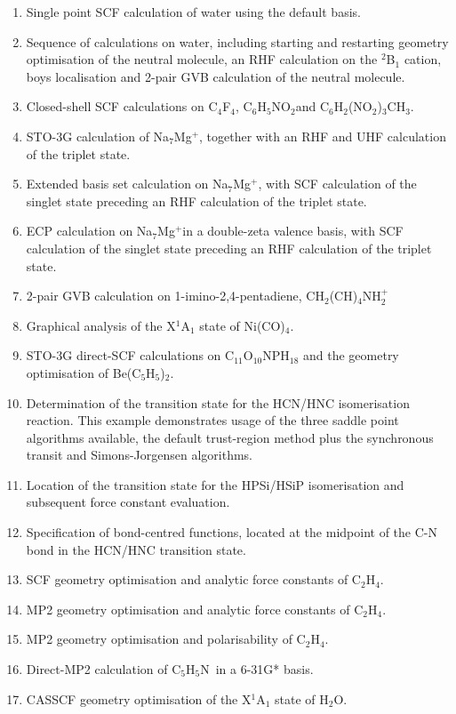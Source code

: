 \documentclass[11pt,fleqn]{article}
\newcommand{\water}{\mbox{H$_{2}$O}}
\newcommand{\namgplus}{\mbox{Na$_{7}$Mg$^{+}$}}
\newcommand{\nitrobz}{\mbox{C$_{6}$H$_{5}$NO$_{2}$}}
\newcommand{\tnt}{\mbox{C$_{6}$H$_{2}$(NO$_{2}$)$_{3}$CH$_{3}$}}
\newcommand{\nico}{\mbox{Ni(CO)$_{4}$}}
\newcommand{\fcubane}{\mbox{C$_{4}$F$_{4}$}}
\newcommand{\ethene}{\mbox{C$_{2}$H$_{4}$}}
\newcommand{\pyridine}{\mbox{C$_{5}$H$_{5}$N}}
\begin{document}
\begin{enumerate}
\item Single point SCF calculation of water using the default basis.
\item Sequence of calculations on water, including starting and
restarting geometry optimisation of the neutral molecule,
an RHF calculation on the $^{2}$B$_{1}$ cation, boys localisation
and 2-pair GVB calculation of the neutral molecule. 
\item Closed-shell SCF calculations on \fcubane, \nitrobz and \tnt.
\item STO-3G calculation of \namgplus, together with an RHF and UHF
calculation of the triplet state.
\item Extended basis set calculation on \namgplus, with SCF calculation
of the singlet state preceding an RHF calculation of the triplet state.
\item ECP calculation on \namgplus in a double-zeta valence
basis, with SCF calculation
of the singlet state preceding an RHF calculation of the triplet state.
\item 2-pair GVB calculation on 
1-imino-2,4-pentadiene, CH$_{2}$(CH)$_{4}$NH$_{2}^{+}$
\item Graphical analysis of the X$^{1}$A$_{1}$ state of \nico.
\item STO-3G direct-SCF calculations on C$_{11}$O$_{10}$NPH$_{18}$
and the geometry optimisation of Be(C$_{5}$H$_{5}$)$_{2}$.
\item Determination of the transition state for the HCN/HNC
isomerisation reaction. This example demonstrates usage of the 
three saddle point algorithms available, the default trust-region
method plus the synchronous transit and Simons-Jorgensen algorithms.
\item Location of the transition state for the HPSi/HSiP
isomerisation and subsequent force constant evaluation.
\item Specification of bond-centred functions, located at the
midpoint of the C-N bond in the HCN/HNC transition state.
\item SCF geometry optimisation and analytic force constants
of \ethene.
\item MP2 geometry optimisation and analytic force constants
of \ethene.
\item MP2 geometry optimisation and polarisability of \ethene.
\item Direct-MP2 calculation of \pyridine\ in a 6-31G* basis.
\item CASSCF geometry optimisation of the X$^{1}$A$_{1}$ state of \water.

\end{enumerate}
\end{document}
